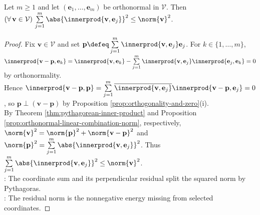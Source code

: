 \begin{theorem} \label{thm:bessel-inequality-finite-orthonormal-list} \\
Let $m\geq1$ and let $(\mathbf{e}_1,\ldots,\mathbf{e}_m)$ be orthonormal in $\mathcal{V}$. Then $(\forall\,\mathbf{v}\in\mathcal{V})\,\sum\limits_{j=1}^{m}\abs{\innerprod{\mathbf{v},\mathbf{e}_j}}^2\leq\norm{\mathbf{v}}^2$.
\begin{proof}
Fix $\mathbf{v}\in\mathcal{V}$ and set $\mathbf{p}\defeq\sum\limits_{j=1}^{m}\innerprod{\mathbf{v},\mathbf{e}_j}\mathbf{e}_j$. For $k\in\{1,\ldots,m\}$, $\innerprod{\mathbf{v}-\mathbf{p},\mathbf{e}_k}=\innerprod{\mathbf{v},\mathbf{e}_k}-\sum\limits_{j=1}^{m}\innerprod{\mathbf{v},\mathbf{e}_j}\innerprod{\mathbf{e}_j,\mathbf{e}_k}=0$ by orthonormality.\\
Hence $\innerprod{\mathbf{v}-\mathbf{p},\mathbf{p}}=\sum\limits_{j=1}^{m}\overline{\innerprod{\mathbf{v},\mathbf{e}_j}}\innerprod{\mathbf{v}-\mathbf{p},\mathbf{e}_j}=0$, so $\mathbf{p}\perp(\mathbf{v}-\mathbf{p})$ by Proposition \ref{prop:orthogonality-and-zero}(i).\\
By Theorem \ref{thm:pythagorean-inner-product} and Proposition \ref{prop:orthonormal-linear-combination-norm}, respectively, $\norm{\mathbf{v}}^2=\norm{\mathbf{p}}^2+\norm{\mathbf{v}-\mathbf{p}}^2$ and $\norm{\mathbf{p}}^2=\sum\limits_{j=1}^{m}\abs{\innerprod{\mathbf{v},\mathbf{e}_j}}^2$. Thus $\sum\limits_{j=1}^{m}\abs{\innerprod{\mathbf{v},\mathbf{e}_j}}^2\leq\norm{\mathbf{v}}^2$.\\
: The coordinate sum and its perpendicular residual split the squared norm by Pythagoras.\\
: The residual norm is the nonnegative energy missing from selected coordinates.
\end{proof}
\end{theorem}

